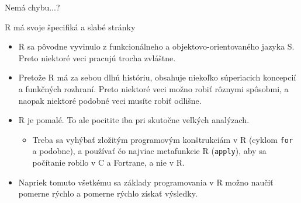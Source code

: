 \begin{frame}{Nemá chybu...?}
	\begin{block}{R má svoje špecifiká a slabé stránky}
		\begin{itemize}
			\item R sa pôvodne vyvinulo z funkcionálneho a objektovo-orientovaného jazyka S. Preto niektoré veci pracujú trocha zvláštne.
			\item Pretože R má za sebou dlhú históriu, obsahuje niekoľko súperiacich koncepcií a funkčných rozhraní. Preto niektoré veci možno robiť rôznymi spôsobmi, a naopak niektoré podobné veci musíte robiť odlišne.
			\item R je pomalé. To ale pocitite iba pri skutočne veľkých analýzach. 
			\begin{itemize}
				\item Treba sa vyhýbať zložitým programovým konštrukciám v R (cyklom \texttt{for} a podobne), a používať čo najviac metafunkcie R (\texttt{apply}), aby sa počítanie robilo v C a Fortrane, a nie v R. 
			\end{itemize}
			\item Napriek tomuto všetkému sa základy programovania v R možno naučiť pomerne rýchlo a pomerne rýchlo získať výsledky.
		\end{itemize}
	\end{block}
\end{frame}
